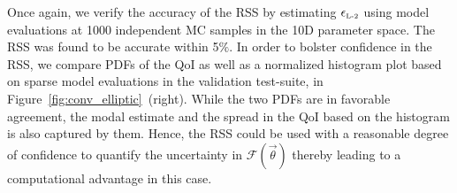 Once again, we verify the accuracy of the RSS by estimating $\epsilon_{\mbox{\tiny{L-2}}}$
using model evaluations at 1000 independent MC samples in the 10D parameter
space. The RSS was found to be accurate
within 5$\%$. In order to bolster confidence in the RSS, we compare PDFs of the QoI
as well as a normalized histogram plot based on sparse model evaluations in the  
validation test-suite, in 
Figure~\ref{fig:conv_elliptic}~(right). While the two PDFs are in favorable agreement,
the modal estimate and the spread in the QoI based on the histogram is also captured
by them. Hence, the RSS could be used with a reasonable degree of confidence to
quantify the uncertainty in $\mathcal{F}(\vec\theta)$ thereby leading to
a computational advantage in this case.































